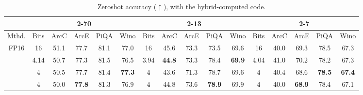 \begin{table}[t]
\caption{Zeroshot accuracy ($\uparrow$), \qts with the hybrid-computed code.}
\small\sc
\tabcolsep=0.04cm
\centering
\begin{tabular}{@{}cccccccccccccccc@{}}
                                                    & \multicolumn{5}{c}{2-70}                                                                                          & \multicolumn{5}{c}{2-13}                                                                                          & \multicolumn{5}{c}{2-7}                                              \\ \midrule
\multicolumn{1}{c|}{Mthd.}                          & Bits & ArcC          & ArcE          & PiQA          & \multicolumn{1}{c|}{Wino}                                  & Bits & ArcC          & ArcE          & PiQA          & \multicolumn{1}{c|}{Wino}                                  & Bits & ArcC          & ArcE          & PiQA          & Wino          \\ \midrule
\multicolumn{1}{c|}{FP16}                           & 16   & 51.1          & 77.7          & 81.1          & \multicolumn{1}{c|}{77.0}                                  & 16   & 45.6          & 73.3          & 73.5          & \multicolumn{1}{c|}{69.6}                                  & 16   & 40.0          & 69.3          & 78.5          & 67.3          \\
\rowcolor[HTML]{D9D9D9} 
\multicolumn{1}{c|}{\cellcolor[HTML]{D9D9D9}AQLM}   & 4.14 & 50.7          & 77.3          & 81.5          & \multicolumn{1}{c|}{\cellcolor[HTML]{D9D9D9}76.5}          & 3.94 & \textbf{44.8} & 73.3          & 78.4          & \multicolumn{1}{c|}{\cellcolor[HTML]{D9D9D9}\textbf{69.9}} & 4.04 & 41.0          & 70.2          & 78.2          & 67.3          \\
\rowcolor[HTML]{D9D9D9} 
\multicolumn{1}{c|}{\cellcolor[HTML]{D9D9D9}QuIP\#} & 4    & 50.5          & 77.7          & 81.4          & \multicolumn{1}{c|}{\cellcolor[HTML]{D9D9D9}\textbf{77.3}} & 4    & 43.6          & 71.3          & 78.7          & \multicolumn{1}{c|}{\cellcolor[HTML]{D9D9D9}69.6}          & 4    & 40.4          & 68.6          & \textbf{78.5} & \textbf{67.4} \\
\rowcolor[HTML]{D9D9D9} 
\multicolumn{1}{c|}{\cellcolor[HTML]{D9D9D9}QTIP}   & 4    & 50.0          & \textbf{77.8} & 81.3          & \multicolumn{1}{c|}{\cellcolor[HTML]{D9D9D9}76.9}          & 4    & 44.8          & 73.6          & \textbf{78.9} & \multicolumn{1}{c|}{\cellcolor[HTML]{D9D9D9}69.9}          & 4    & 40.0          & \textbf{68.9} & 78.4          & 67.1          \\

\end{tabular}
\end{table}
